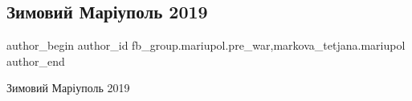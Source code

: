 
 
 
 
 

\subsection{Зимовий Маріуполь 2019}
\label{sec:11_02_2023.fb.fb_group.mariupol.pre_war.10.zimovii_mar_upol_201}
 
\ifcmt
 author_begin
   author_id fb_group.mariupol.pre_war,markova_tetjana.mariupol
 author_end
\fi

Зимовий Маріуполь 2019


